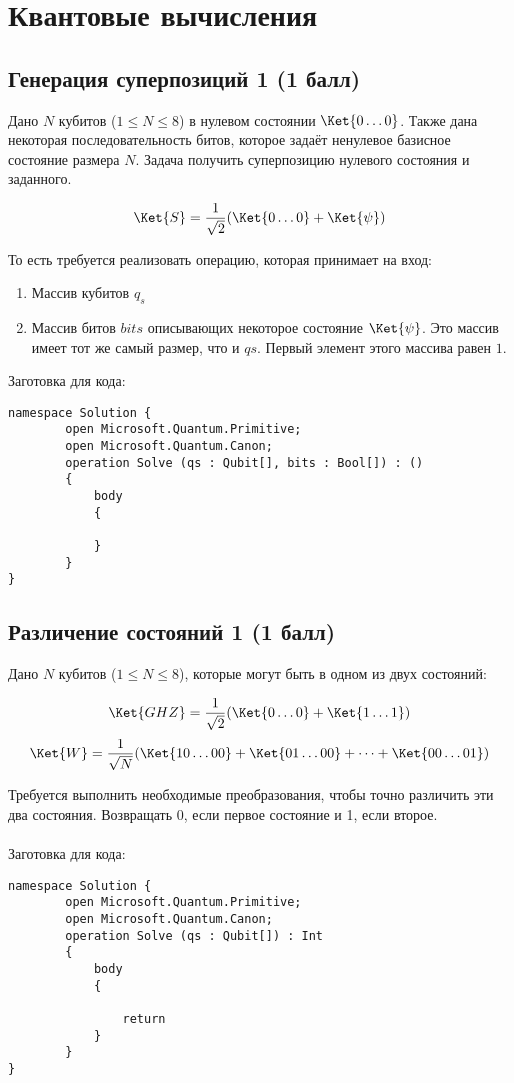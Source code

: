 \documentclass[a4paper]{article}
\begin{document}
\section{Квантовые вычисления}

\subsection{Генерация суперпозиций 1 (1 балл)}

Дано $N$ кубитов ($1 \le N \le 8$) в нулевом состоянии $\Ket{0\dots0}$. Также дана некоторая последовательность битов, которое задаёт ненулевое базисное состояние размера $N$. Задача получить суперпозицию нулевого состояния и заданного.

$$\Ket{S} = \frac{1}{\sqrt2}(\Ket{0\dots0} +\Ket{\psi})$$

То есть требуется реализовать операцию, которая принимает на вход:

\begin{enumerate}
    \item Массив кубитов $q_s$
    \item Массив битов $bits$ описывающих некоторое состояние $\Ket{\psi}$. Это массив имеет тот же самый размер, что и $qs$. Первый элемент этого массива равен $1$.
\end{enumerate}


Заготовка для кода:
\begin{lstlisting}
namespace Solution {
        open Microsoft.Quantum.Primitive;
        open Microsoft.Quantum.Canon;
        operation Solve (qs : Qubit[], bits : Bool[]) : ()
        {
            body
            {

            }
        }
}
\end{lstlisting}

\subsection{Различение состояний 1 (1 балл)}

Дано $N$ кубитов ($1 \le N \le 8$), которые могут быть в одном из двух состояний:

$$\Ket{GHZ} = \frac{1}{\sqrt2}(\Ket{0\dots0} +\Ket{1\dots1})$$
$$\Ket{W} = \frac{1}{\sqrt N}(\Ket{10\dots00}+\Ket{01\dots00} + \dots +\Ket{00\dots01})$$

Требуется выполнить необходимые преобразования, чтобы точно различить эти два состояния. Возвращать $0$, если первое состояние и 1, если второе. 
\\\\
Заготовка для кода:
\begin{lstlisting}
namespace Solution {
        open Microsoft.Quantum.Primitive;
        open Microsoft.Quantum.Canon;
        operation Solve (qs : Qubit[]) : Int
        {
            body
            {

                return 
            }
        }
}
\end{lstlisting}





\end{document}
